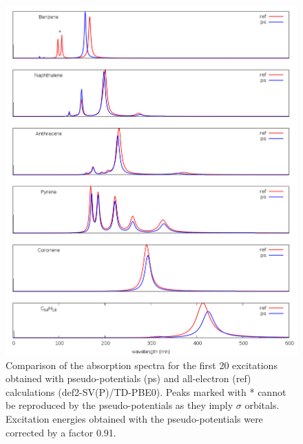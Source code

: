 \documentclass[12pt]{article}
\begin{document}

\begin{figure}
\begin{center}
\includegraphics[width=16cm]{grand_rpa_singlet}
\end{center}
\vspace{0.25in}
\hspace*{3in}
\caption{Comparison of the absorption spectra for the first 20 excitations obtained with
pseudo-potentials (ps) and all-electron (ref) calculations (def2-SV(P)/TD-PBE0). Peaks marked
with * cannot be reproduced by the pseudo-potentials as they imply $\sigma$ orbitals.
Excitation energies obtained with the pseudo-potentials were corrected by a factor 0.91.}
\label{fig:cnhn_uv}
\end{figure}
\end{document}
